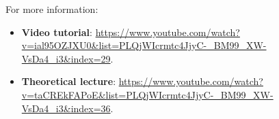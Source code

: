   For more information: 
\begin{itemize}
   \item \textbf{Video tutorial}:  \url{https://www.youtube.com/watch?v=ial95OZJXU0&list=PLQjWIcrmtc4JjyC-_BM99_XW-VsDa4_i3&index=29}.
   \item \textbf{Theoretical lecture}:  \url{https://www.youtube.com/watch?v=taCREkFAPoE&list=PLQjWIcrmtc4JjyC-_BM99_XW-VsDa4_i3&index=36}.
  \end{itemize}           

